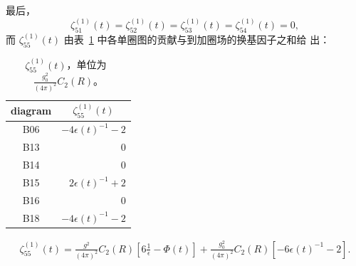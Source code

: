 最后，
\begin{equation}
   \zeta_{51}^{(1)}(t)
   =\zeta_{52}^{(1)}(t)=\zeta_{53}^{(1)}(t)=\zeta_{54}^{(1)}(t)=0,
\label{eq:(4.53)}
\end{equation}
而 $\zeta_{55}^{(1)}(t)$ 由表~\ref{table:4} 中各单圈图的贡献与到加圈场的换基因子之和给
出：
%
\begin{table}
\caption{$\zeta_{55}^{(1)}(t)$，单位为~$\frac{g_0^2}{(4\pi)^2}C_2(R)$。}
\label{table:4}
\begin{center}
\renewcommand{\arraystretch}{2.2}
\setlength{\tabcolsep}{20pt}
\begin{tabular}{cr}
\toprule
 diagram & \multicolumn{1}{c}{$\zeta_{55}^{(1)}(t)$} \\
\midrule
 B06 & $-4\epsilon(t)^{-1}-2$ \\
 B13 & $0$ \\
 B14 & $0$ \\
 B15 & $2\epsilon(t)^{-1}+2$ \\
 B16 & $0$ \\
 B18 & $-4\epsilon(t)^{-1}-2$ \\
\bottomrule
\end{tabular}
\end{center}
\end{table}
%
\begin{align}
   \zeta_{55}^{(1)}(t)
   =\frac{g^2}{(4\pi)^2}C_2(R)
   \left[6\frac{1}{\epsilon}-\Phi(t)\right]
   +\frac{g_0^2}{(4\pi)^2}C_2(R)
   \left[-6\epsilon(t)^{-1}-2\right].
\label{eq:(4.54)}
\end{align}

